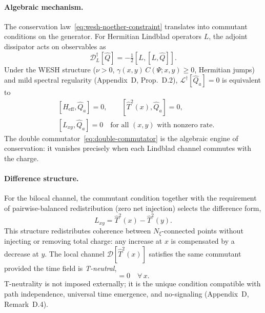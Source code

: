 \documentclass[12pt,a4paper]{article}
\numberwithin{equation}{section}
\begin{document}
\paragraph{Algebraic mechanism.}
The conservation law~\eqref{eq:wesh-noether-constraint} translates into 
commutant conditions on the generator. For Hermitian Lindblad operators 
$L$, the adjoint dissipator acts on observables as
\begin{equation}
\mathcal{D}^\dagger_L[\hat{Q}] = -\tfrac{1}{2}[L,[L,\hat{Q}]].
\label{eq:double-commutator}
\end{equation}
Under the WESH structure ($\nu>0$, $\gamma(x,y)\,C(\Psi;x,y)\ge 0$, Hermitian 
jumps) and mild spectral regularity (Appendix~D, Prop.~D.2), 
$\mathcal{L}^\dagger[\hat{Q}_a] = 0$ is equivalent to
\begin{equation}
\begin{split}
&[H_{\mathrm{eff}}, \hat{Q}_a] = 0, \qquad 
[\hat{T}^2(x), \hat{Q}_a] = 0, \\
&[L_{xy}, \hat{Q}_a] = 0 \quad \text{for all $(x,y)$ with nonzero rate}.
\end{split}
\label{eq:commutant-conditions}
\end{equation}
The double commutator~\eqref{eq:double-commutator} is the algebraic engine 
of conservation: it vanishes precisely when each Lindblad channel commutes 
with the charge.

\paragraph{Difference structure.}
For the bilocal channel, the commutant condition together with the requirement 
of pairwise-balanced redistribution (zero net injection) selects the difference form,
\begin{equation}
L_{xy} = \hat{T}^2(x) - \hat{T}^2(y).
\label{eq:difference_Lxy}
\end{equation}
This structure redistributes coherence between $N_\xi$-connected points 
without injecting or removing total charge: any increase at $x$ is 
compensated by a decrease at $y$. The local channel 
$\mathcal{D}[\hat{T}^2(x)]$ satisfies the same commutant provided the 
time field is \emph{T-neutral},
\begin{equation}
[\hat{T}(x), \hat{Q}_{\mathrm{tot}}] = 0 \quad \forall\, x.
\label{eq:T-neutrality}
\end{equation}
T-neutrality is not imposed externally; it is the unique condition 
compatible with path independence, universal time emergence, and 
no-signaling (Appendix~D, Remark~D.4).
\end{document}
